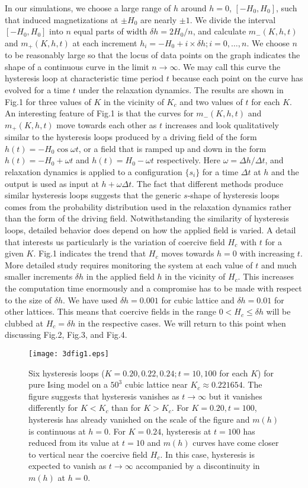 \documentclass[a4,aps,amsmath,floatfix,nofootinbib,10pt]{revtex4}
\begin{document}
In our simulations, we choose a large range of $h$ around $h=0$, 
$[-H_0,H_0]$, such that induced magnetizations at $\pm H_0$ are nearly 
$\pm 1$. We divide the interval $[-H_0,H_0]$ into $n$ equal parts of 
width $\delta h=2H_0/n$, and calculate $m_-(K,h,t)$ and $m_+(K,h,t)$ at 
each increment $h_i=-H_0+i \times \delta h; i=0,\ldots,n$. We choose 
$n$ to be reasonably large so that the locus of data points on the 
graph indicates the shape of a continuous curve in the limit $n \to 
\infty$. We may call this curve the hysteresis loop at characteristic 
time period $t$ because each point on the curve has evolved for a time 
$t$ under the relaxation dynamics. The results are shown in Fig.1 for 
three values of $K$ in the vicinity of $K_c$ and two values of $t$ for 
each $K$. An interesting feature of Fig.1 is that the curves for 
$m_-(K,h,t)$ and $m_+(K,h,t)$ move towards each other as $t$ increases 
and look qualitatively similar to the hysteresis loops produced by a 
driving field of the form $h(t)=-H_0 \cos{\omega t}$, or a field that 
is ramped up and down in the form $h(t)=-H_0 + \omega t$ and $h(t)=H_0 
- \omega t$ respectively. Here $\omega=\Delta h / \Delta t$, and 
relaxation dynamics is applied to a configuration $\{s_i\}$ for a time 
$\Delta t$ at $h$ and the output is used as input at $h+ \omega \Delta 
t$. The fact that different methods produce similar hysteresis loops 
suggests that the generic $s$-shape of hysteresis loops comes from the 
probability distribution used in the relaxation dynamics rather than 
the form of the driving field. Notwithstanding the similarity of 
hysteresis loops, detailed behavior does depend on how the applied 
field is varied. A detail that interests us particularly is the 
variation of coercive field $H_c$ with $t$ for a given $K$. Fig.1 
indicates the trend that $H_c$ moves towards $h=0$ with increasing $t$. 
More detailed study requires monitoring the system at each value of $t$ 
and much smaller increments $\delta h$ in the applied field $h$ in the 
vicinity of $H_c$. This increases the computation time enormously and a 
compromise has to be made with respect to the size of $\delta h$. We 
have used $\delta h=0.001$ for cubic lattice and $\delta h=0.01$ for 
other lattices. This means that coercive fields in the range $0 < H_c 
\le \delta h$ will be clubbed at $H_c=\delta h$ in the respective 
cases. We will return to this point when discussing Fig.2, Fig.3, and 
Fig.4.


\begin{figure}[ht] 
\texttt{[image: 3dfig1.eps]} \caption{ 
Six hysteresis loops ($K=0.20, 0.22, 0.24;t=10, 100$ for each $K$) for 
pure Ising model on a $50^3$ cubic lattice near $K_c \approx 0.221654$. 
The figure suggests that hysteresis vanishes as $t \to \infty$ but it 
vanishes differently for $K < K_c$ than for $K>K_c$. For $K=0.20, 
t=100$, hysteresis has already vanished on the scale of the figure and 
$m(h)$ is continuous at $h=0$. For $K=0.24$, hysteresis at $t=100$ has 
reduced from its value at $t=10$ and $m(h)$ curves have come closer to 
vertical near the coercive field $H_c$. In this case, hysteresis is 
expected to vanish as $t \to \infty$ accompanied by a discontinuity in 
$m(h)$ at $h=0$.} \label{fig1} \end{figure}
\end{document}

